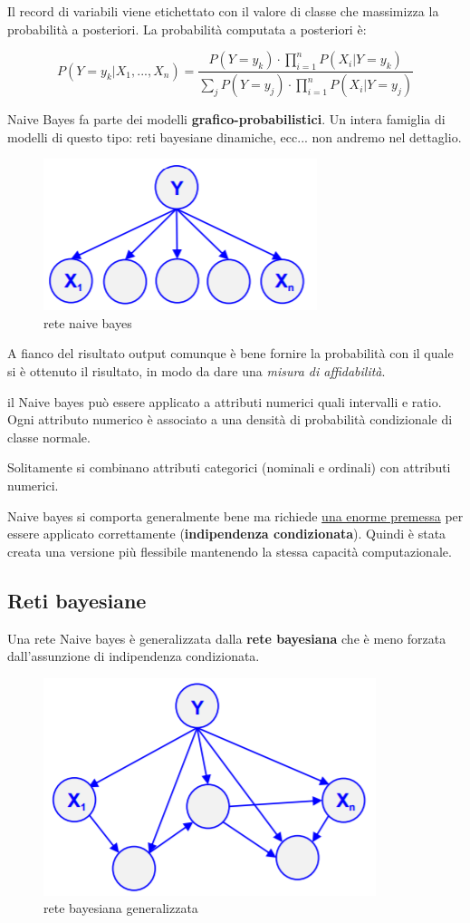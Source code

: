 \documentclass[12pt, a4paper,titlepage,openany]{article}
\begin{document}
Il record di variabili viene etichettato con il valore di classe che massimizza la probabilit\`a a posteriori.
La probabilit\`a computata a posteriori \`e:

\[P(Y=y_k|X_1,...,X_n) = \frac{P(Y=y_k)\cdot \prod_{i=1}^{n}P(X_i|Y=y_k)}{\sum_{j}P(Y=y_j) \cdot \prod_{i=1}^{n}P(X_i|Y=y_j)} \]

Naive Bayes fa parte dei modelli \textbf{grafico-probabilistici}. Un intera famiglia di modelli di questo tipo: reti bayesiane dinamiche, ecc... non andremo nel dettaglio.

\begin{figure}[h!]
	\centering
	\includegraphics[height=0.3 \linewidth]{pict/naivebayes.png}
	\caption{rete naive bayes}
\end{figure}

A fianco del risultato output comunque \`e bene fornire la probabilit\`a con il quale si \`e ottenuto il risultato, in modo da dare una \textit{misura di affidabilit\`a}. 

il Naive bayes pu\`o essere applicato a attributi numerici quali intervalli e ratio. Ogni attributo numerico è associato a una densit\`a di probabilit\`a condizionale di classe normale. 

Solitamente si combinano attributi categorici (nominali e ordinali) con attributi numerici. 

Naive bayes si comporta generalmente bene ma richiede \underline{una enorme premessa} per essere applicato correttamente (\textbf{indipendenza condizionata}). Quindi \`e stata creata una versione pi\`u flessibile mantenendo la stessa capacit\`a computazionale.

\subsection{Reti bayesiane}
Una rete Naive bayes \`e generalizzata dalla \textbf{rete bayesiana} che \`e meno forzata dall'assunzione di indipendenza condizionata. 

\begin{figure}[h!]
	\centering
	\includegraphics[height=0.35 \linewidth]{pict/networkbayes.png}
	\caption{rete bayesiana generalizzata}
\end{figure}
\end{document}
